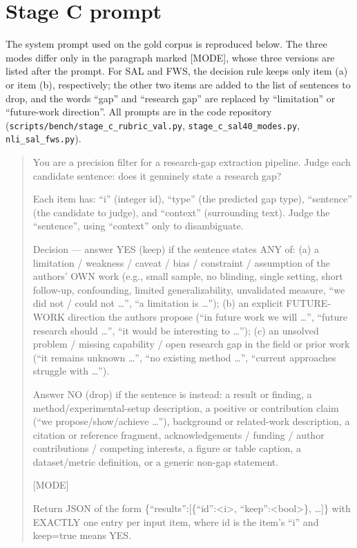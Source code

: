 \section{Stage C prompt}
\label{app:prompts}

The system prompt used on the gold corpus is reproduced below. The three modes differ only in the paragraph marked [MODE], whose three versions are listed after the prompt. For SAL and FWS, the decision rule keeps only item (a) or item (b), respectively; the other two items are added to the list of sentences to drop, and the words ``gap'' and ``research gap'' are replaced by ``limitation'' or ``future-work direction''. All prompts are in the code repository (\texttt{scripts/bench/stage\_c\_rubric\_val.py}, \texttt{stage\_c\_sal40\_modes.py}, \texttt{nli\_sal\_fws.py}).

\begin{quote}\small\raggedright
You are a precision filter for a research-gap extraction pipeline. Judge each candidate sentence: does it genuinely state a research gap?

Each item has: ``i'' (integer id), ``type'' (the predicted gap type), ``sentence'' (the candidate to judge), and ``context'' (surrounding text). Judge the ``sentence'', using ``context'' only to disambiguate.

Decision --- answer YES (keep) if the sentence states ANY of:
(a) a limitation / weakness / caveat / bias / constraint / assumption of the authors' OWN work (e.g., small sample, no blinding, single setting, short follow-up, confounding, limited generalizability, unvalidated measure, ``we did not / could not \ldots'', ``a limitation is \ldots'');
(b) an explicit FUTURE-WORK direction the authors propose (``in future work we will \ldots'', ``future research should \ldots'', ``it would be interesting to \ldots'');
(c) an unsolved problem / missing capability / open research gap in the field or prior work (``it remains unknown \ldots'', ``no existing method \ldots'', ``current approaches struggle with \ldots'').

Answer NO (drop) if the sentence is instead: a result or finding, a method/experimental-setup description, a positive or contribution claim (``we propose/show/achieve \ldots''), background or related-work description, a citation or reference fragment, acknowledgements / funding / author contributions / competing interests, a figure or table caption, a dataset/metric definition, or a generic non-gap statement.

[MODE]

Return JSON of the form \{``results'':[\{``id'':\textless i\textgreater, ``keep'':\textless bool\textgreater\}, \ldots]\} with EXACTLY one entry per input item, where id is the item's ``i'' and keep=true means YES.
\end{quote}

